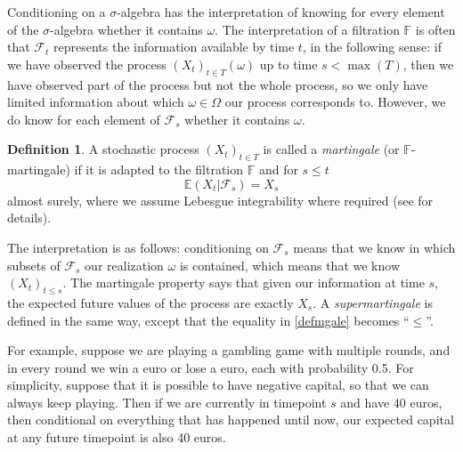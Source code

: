 \documentclass[11pt]{article}
\theoremstyle{plain}
\theoremstyle{definition}
\newtheorem{definition}{Definition}[section]
\newcommand{\citt}{\citet}
\begin{document}
Conditioning on a $\sigma$-algebra has the interpretation of knowing for every element of the $\sigma$-algebra whether it contains $\omega$.
The interpretation of a filtration $\mathbb{F}$ is often that $\mathcal{F}_t$ represents the information available by time $t$, in the following sense: if we have observed the process $(X_t)_{t\in T}(\omega)$ up to time $s<\max(T)$, then we have observed part of the process but not the whole process, so we only have limited information about which $\omega\in \Omega$ our process corresponds to. However, we do know for each element of $\mathcal{F}_s$ whether it contains $\omega$. %





\begin{definition} \label{defmart}
A stochastic process $(X_t)_{t\in T}$ is called a \emph{martingale} (or $\mathbb{F}$-martingale) if it is adapted to the filtration $\mathbb{F}$ and for $s\leq t$ 
\begin{equation} \label{defmgale}
\mathbb{E}(X_t|\mathcal{F}_s) =  X_s
\end{equation}
almost surely, where we assume Lebesgue integrability where required (see \citt{spreij2023measure} for details).
\end{definition}
The  interpretation is as follows:  conditioning on $\mathcal{F}_s$ means that we know in which subsets of $\mathcal{F}_s$ our realization $\omega$ is contained, which means that we know $(X_t)_{t\leq s}$. The martingale property says that given our information at time $s$, the expected future values of the process are exactly $X_s$. A \emph{supermartingale} is defined in the same way, except that the equality in \eqref{defmgale} becomes ``$\leq$''.



For example, suppose we are playing a gambling game with multiple rounds, and in every round we win a euro or lose a euro, each with probability 0.5. For simplicity, suppose that it is possible to have negative capital, so that we can always keep playing. Then if we are currently in timepoint $s$ and have 40 euros, then conditional on everything that has happened until now, our expected capital at any future timepoint is also 40 euros. %
\end{document}
